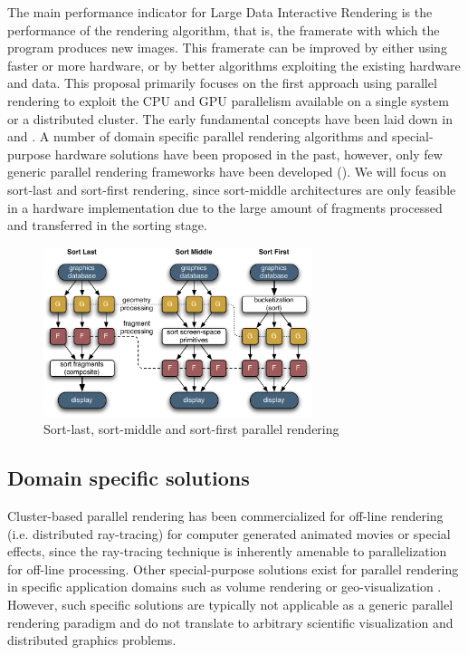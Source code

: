 The main performance indicator for Large Data Interactive Rendering is the
performance of the rendering algorithm, that is, the framerate with which the
program produces new images. This framerate can be improved by either using
faster or more hardware, or by better algorithms exploiting the existing
hardware and data. This proposal primarily focuses on the first approach using
parallel rendering to exploit the CPU and GPU parallelism available on a single
system or a distributed cluster.  The early fundamental concepts have been laid
down in \cite{MCEF:94} and \cite{Crockett:97}. A number of domain specific
parallel rendering algorithms and special-purpose hardware solutions have been
proposed in the past, however, only few generic parallel rendering frameworks
have been developed (). We will focus on sort-last and sort-first
rendering, since sort-middle architectures are only feasible in a hardware
implementation due to the large amount of fragments processed and transferred in
the sorting stage.

\begin{figure}[ht]\center
\includegraphics[width=0.7\textwidth]{images/all_sorts}%
\caption{Sort-last, sort-middle and sort-first parallel rendering\label{fSorts}}
\end{figure}


\subsection{Domain specific solutions}

Cluster-based parallel rendering has been commercialized for off-line rendering
(i.e. distributed ray-tracing) for computer generated animated movies or special
effects, since the ray-tracing technique is inherently amenable to
parallelization for off-line processing. Other special-purpose solutions exist
for parallel rendering in specific application domains such as volume rendering
\cite{LWMT:97,Wittenbrink:98,HSCSM:00,SL:02,GS:02,NSJLYZ:05} or
geo-visualization \cite{VR:91,AG:95,LDC:96,JLMV:06}. However, such specific
solutions are typically not applicable as a generic parallel rendering paradigm
and do not translate to arbitrary scientific visualization and distributed
graphics problems.

